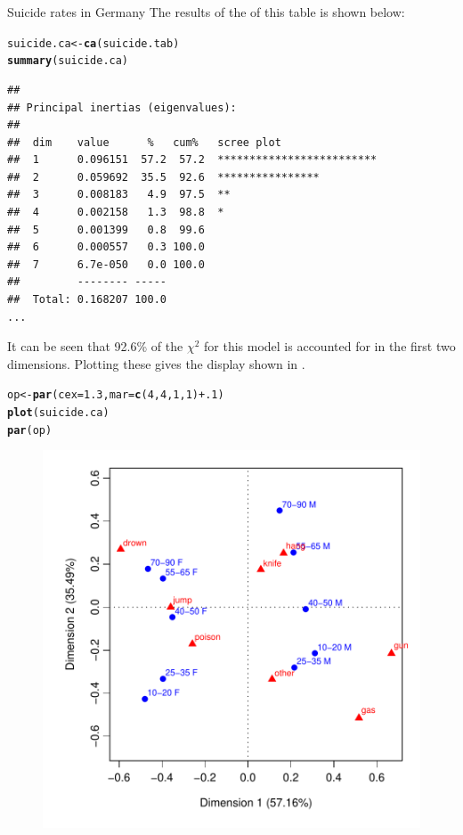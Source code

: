 \documentclass[11pt]{book}\usepackage[]{graphicx}\usepackage[]{color}
\makeatletter
\newcommand{\hlnum}[1]{\textcolor[rgb]{0.686,0.059,0.569}{#1}}%
\newcommand{\hlopt}[1]{\textcolor[rgb]{0,0,0}{#1}}%
\newcommand{\hlstd}[1]{\textcolor[rgb]{0.345,0.345,0.345}{#1}}%
\newcommand{\hlkwb}[1]{\textcolor[rgb]{0.69,0.353,0.396}{#1}}%
\newcommand{\hlkwc}[1]{\textcolor[rgb]{0.333,0.667,0.333}{#1}}%
\newcommand{\hlkwd}[1]{\textcolor[rgb]{0.737,0.353,0.396}{\textbf{#1}}}%
\newenvironment{kframe}{%
 \def\at@end@of@kframe{}%
 \ifinner\ifhmode%
  \def\at@end@of@kframe{\end{minipage}}%
  \begin{minipage}{\columnwidth}%
 \fi\fi%
 \def\FrameCommand##1{\hskip\@totalleftmargin \hskip-\fboxsep
 \colorbox{shadecolor}{##1}\hskip-\fboxsep
     \hskip-\linewidth \hskip-\@totalleftmargin \hskip\columnwidth}%
 \MakeFramed {\advance\hsize-\width
   \@totalleftmargin\z@ \linewidth\hsize
   \@setminipage}}%
 {\par\unskip\endMakeFramed%
 \at@end@of@kframe}
\newenvironment{knitrout}{}{} %
\renewenvironment{knitrout}{\small\renewcommand{\baselinestretch}{.85}}{} %
\makeatother
\begin{document}
\begin{Example}[suicide1]{Suicide rates in Germany}
The results of the \ca of this table is shown below:
\begin{knitrout}
\color{fgcolor}\begin{kframe}
\begin{alltt}
\hlstd{suicide.ca} \hlkwb{<-} \hlkwd{ca}\hlstd{(suicide.tab)}
\hlkwd{summary}\hlstd{(suicide.ca)}
\end{alltt}
\begin{verbatim}
## 
## Principal inertias (eigenvalues):
## 
##  dim    value      %   cum%   scree plot               
##  1      0.096151  57.2  57.2  *************************
##  2      0.059692  35.5  92.6  ****************         
##  3      0.008183   4.9  97.5  **                       
##  4      0.002158   1.3  98.8  *                        
##  5      0.001399   0.8  99.6                           
##  6      0.000557   0.3 100.0                           
##  7      6.7e-050   0.0 100.0                           
##         -------- -----                                 
##  Total: 0.168207 100.0                                 
...
\end{verbatim}
\end{kframe}
\end{knitrout}

It can be seen that 92.6\% of the $\chi^2$ for this model is accounted for in
the first two dimensions.  Plotting these gives the display shown in 
.

\begin{knitrout}
\color{fgcolor}\begin{kframe}
\begin{alltt}
\hlstd{op} \hlkwb{<-} \hlkwd{par}\hlstd{(}\hlkwc{cex}\hlstd{=}\hlnum{1.3}\hlstd{,} \hlkwc{mar}\hlstd{=}\hlkwd{c}\hlstd{(}\hlnum{4}\hlstd{,}\hlnum{4}\hlstd{,}\hlnum{1}\hlstd{,}\hlnum{1}\hlstd{)}\hlopt{+}\hlnum{.1}\hlstd{)}
\hlkwd{plot}\hlstd{(suicide.ca)}
\hlkwd{par}\hlstd{(op)}
\end{alltt}
\end{kframe}\begin{figure}[htbp]


\centerline{\includegraphics[width=.7\textwidth]{ch06/fig/ca-suicide-plot} }


\end{figure}
\end{knitrout}
\end{Example}
\end{document}
